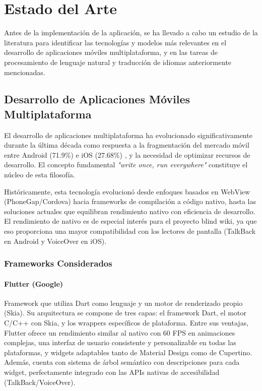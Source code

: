 \section{Estado del Arte}

Antes de la implementación de la aplicación, se ha llevado a cabo un estudio de la literatura para identificar las tecnologías y modelos más relevantes en el desarrollo de aplicaciones móviles multiplataforma, y en las tareas de procesamiento de lenguaje natural y traducción de idiomas anteriormente mencionadas.

\subsection{Desarrollo de Aplicaciones Móviles Multiplataforma}

El desarrollo de aplicaciones multiplataforma ha evolucionado significativamente durante la última década como respuesta a la fragmentación del mercado móvil entre Android (71.9\%) e iOS (27.68\%) \cite{statcounter2025}, y la necesidad de optimizar recursos de desarrollo. El concepto fundamental \textit{"write once, run everywhere"} constituye el núcleo de esta filosofía.

Históricamente, esta tecnología evolucionó desde enfoques basados en WebView (PhoneGap/Cordova) hacia frameworks de compilación a código nativo, hasta las soluciones actuales que equilibran rendimiento nativo con eficiencia de desarrollo. El rendimiento de nativo es de especial interés para el proyecto blind wiki, ya que eso proporciona una mayor compatibilidad con los lectores de pantalla (TalkBack en Android y VoiceOver en iOS).

\subsubsection{Frameworks Considerados}

\paragraph{Flutter (Google)}
Framework que utiliza Dart como lenguaje y un motor de renderizado propio (Skia). Su arquitectura se compone de tres capas: el framework Dart, el motor C/C++ con Skia, y los wrappers específicos de plataforma. Entre sus ventajas, Flutter ofrece un rendimiento similar al nativo con 60 FPS en animaciones complejas, una interfaz de usuario consistente y personalizable en todas las plataformas, y widgets adaptables tanto de Material Design como de Cupertino. Además, cuenta con sistema de árbol semántico con descripciones para cada widget, perfectamente integrado con las APIs nativas de accesibilidad (TalkBack/VoiceOver).

